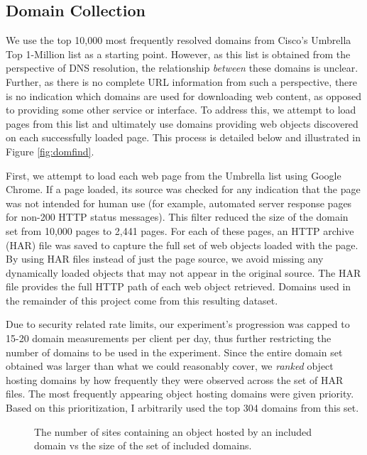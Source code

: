 \subsection{Domain Collection} \label{domcollect}

We use the top 10,000 most frequently resolved domains from Cisco's Umbrella Top
1-Million list \cite{scheitle2018} as a starting point. 
However, as this list is obtained from
the perspective of DNS resolution, the relationship \emph{between} these domains
is unclear. Further, as there is no complete URL information from such a
perspective, there is no indication which domains are used for downloading web
content, as opposed to providing some other service or interface. To address
this, we attempt to load pages from this list and ultimately use domains
providing web objects discovered on each successfully loaded page. This process
is detailed below and illustrated in Figure \ref{fig:domfind}.

First, we attempt to load each web page from the Umbrella list using Google
Chrome. If a page loaded, its source was checked for any indication that the
page was not intended for human use (for example, automated server response
pages for non-200 HTTP status messages). This filter reduced the size of the
domain set from 10,000 pages to 2,441 pages. For each of these pages, an HTTP
archive (HAR) file was saved to capture the full set of web objects loaded with
the page. By using HAR files instead of just the page source, we avoid missing
any dynamically loaded objects that may not appear in the original source. 
The HAR file provides the full HTTP path of each web object retrieved. Domains
used in the remainder of this project come from this resulting dataset. 

Due to security related rate limits, our experiment's progression was capped to
15-20 domain measurements per client per day, thus further restricting the
number of domains to be used in the experiment. Since the entire domain set obtained
was larger than what we could reasonably cover, we \emph{ranked} object hosting domains by how frequently they were
observed across the set of HAR files. The most frequently appearing object
hosting domains were given priority.  Based on this prioritization, I
arbitrarily used the top 304 domains from this set. 

\begin{figure}
    \caption{The number of sites containing an object hosted by an included domain vs
    the size of the set of included domains.}
    \label{fig:sitescovered}
\end{figure}

